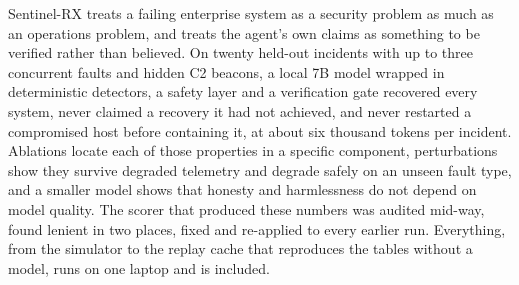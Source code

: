 \documentclass[11pt,a4paper]{article}
\begin{document}
Sentinel-RX treats a failing enterprise system as a security problem as much as an operations
problem, and treats the agent's own claims as something to be verified rather than believed. On
twenty held-out incidents with up to three concurrent faults and hidden C2 beacons, a local 7B model
wrapped in deterministic detectors, a safety layer and a verification gate recovered every system,
never claimed a recovery it had not achieved, and never restarted a compromised host before
containing it, at about six thousand tokens per incident. Ablations locate each of those properties in
a specific component, perturbations show they survive degraded telemetry and degrade safely on an unseen fault type,
and a smaller model shows that honesty and harmlessness do not depend on model quality. The scorer
that produced these numbers was audited mid-way, found lenient in two places, fixed and re-applied
to every earlier run. Everything, from the simulator to the replay cache that reproduces the tables
without a model, runs on one laptop and is included.
\end{document}
